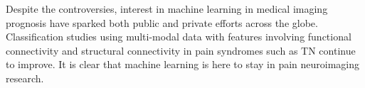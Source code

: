 Despite the controversies, interest in machine learning in medical imaging prognosis have sparked both public and private efforts across the globe. Classification studies using multi-modal data with features involving functional connectivity and structural connectivity in pain syndromes such as TN continue to improve. It is clear that machine learning is here to stay in pain neuroimaging research. 



